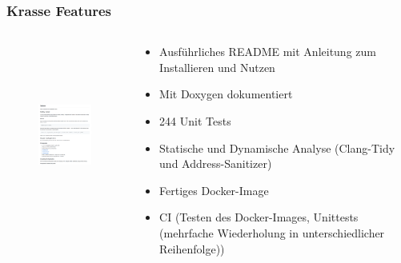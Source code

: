 \documentclass[aspectratio=169]{beamer}
\begin{document}
\begin{frame}
    \frametitle{Krasse Features}
    \begin{columns}
        \begin{column}{0.4\textwidth}
            \begin{center}
                \begin{figure}[H]
                    \includegraphics[height=6cm]{doku.png}
                \end{figure}
            \end{center}
        \end{column}
        \begin{column}{0.6\textwidth}
            \begin{itemize}
                \item Ausführliches README mit Anleitung zum Installieren und Nutzen
                    \pause
                \item Mit Doxygen dokumentiert
                    \pause
                \item 244 Unit Tests %
                    \pause
                \item Statische und Dynamische Analyse (Clang-Tidy und Address-Sanitizer)
                    \pause
                \item Fertiges Docker-Image
                    \pause
                \item CI (Testen des Docker-Images, Unittests (mehrfache Wiederholung in unterschiedlicher Reihenfolge))
            \end{itemize}
        \end{column}
    \end{columns}
\end{frame}
\end{document}
